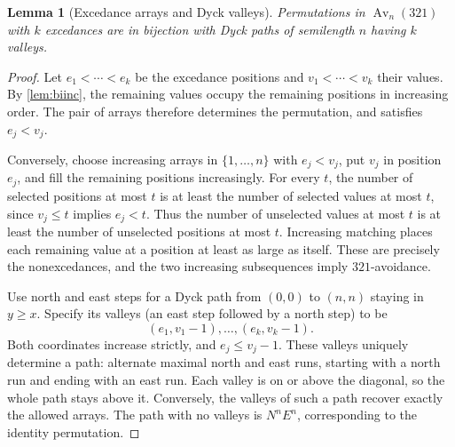 \documentclass[11pt,letterpaper]{article}
\numberwithin{equation}{section}
\newtheorem{lemma}[theorem]{Lemma}
\theoremstyle{definition}
\DeclareMathOperator{\Av}{Av}
\begin{document}
\begin{lemma}[Excedance arrays and Dyck valleys]
\label{lem:dyck}
Permutations in $\Av_n(321)$ with $k$ excedances are in bijection with
Dyck paths of semilength $n$ having $k$ valleys.
\end{lemma}
\begin{proof}
Let $e_1<\cdots<e_k$ be the excedance positions and
$v_1<\cdots<v_k$ their values. By \cref{lem:biinc}, the remaining values
occupy the remaining positions in increasing order. The pair of arrays
therefore determines the permutation, and satisfies $e_j<v_j$.

Conversely, choose increasing arrays in $\{1,\ldots,n\}$ with $e_j<v_j$,
put $v_j$ in position $e_j$, and fill the remaining positions increasingly.
For every $t$, the number of selected positions at most $t$ is at least
the number of selected values at most $t$, since $v_j\le t$ implies
$e_j<t$. Thus the number of unselected values at most $t$ is at least
the number of unselected positions at most $t$. Increasing matching
places each remaining value at a position at least as large as itself.
These are precisely the nonexcedances, and the two increasing
subsequences imply $321$-avoidance.

Use north and east steps for a Dyck path from $(0,0)$ to $(n,n)$ staying
in $y\ge x$. Specify its valleys (an east step followed by a north step)
to be
\[
 (e_1,v_1-1),\ldots,(e_k,v_k-1).
\]
Both coordinates increase strictly, and $e_j\le v_j-1$. These valleys
uniquely determine a path: alternate maximal north and east runs,
starting with a north run and ending with an east run. Each valley is
on or above the diagonal, so the whole path stays above it. Conversely,
the valleys of such a path recover exactly the allowed arrays.
The path with no valleys is $N^nE^n$, corresponding to the identity
permutation.
\end{proof}
\end{document}
